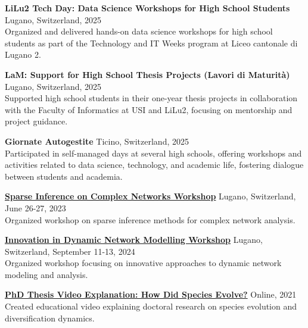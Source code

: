 

\textbf{LiLu2 Tech Day: Data Science Workshops for High School Students} \hfill Lugano, Switzerland, 2025 \\
Organized and delivered hands-on data science workshops for high school students as part of the Technology and IT Weeks program at Liceo cantonale di Lugano 2.

\vspace{0.5em}

\textbf{LaM: Support for High School Thesis Projects (Lavori di Maturità)} \hfill Lugano, Switzerland, 2025 \\
Supported high school students in their one-year thesis projects in collaboration with the Faculty of Informatics at USI and LiLu2, focusing on mentorship and project guidance.

\vspace{0.5em}

\textbf{Giornate Autogestite} \hfill Ticino, Switzerland, 2025 \\
Participated in self-managed days at several high schools, offering workshops and activities related to data science, technology, and academic life, fostering dialogue between students and academia.

\vspace{0.5em}


\textbf{\href{https://www.ci.inf.usi.ch/workshop-sparse-inference-on-complex-networks/}{Sparse Inference on Complex Networks Workshop}} \hfill Lugano, Switzerland, June 26-27, 2023 \\
Organized workshop on sparse inference methods for complex network analysis.

\vspace{0.5em}

\textbf{\href{https://www.ci.inf.usi.ch/innodyn/}{Innovation in Dynamic Network Modelling Workshop}} \hfill Lugano, Switzerland, September 11-13, 2024 \\
Organized workshop focusing on innovative approaches to dynamic network modeling and analysis.

\vspace{0.5em}


\textbf{\href{https://www.youtube.com/watch?v=0RwCzOyzBXY}{PhD Thesis Video Explanation: How Did Species Evolve?}} \hfill Online, 2021 \\
Created educational video explaining doctoral research on species evolution and diversification dynamics.

